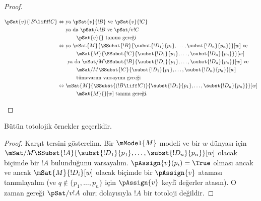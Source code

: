 \begin{proof}
\begin{enumerate}
{{\begin{align*}
        \pSat{v}{!B \liff !C} \Leftrightarrow {} &
        \text{ya } \pSat{v}{!B} \text{ ve } \pSat{v}{!C}\\
        & \text{ya da } \pSat/{v}{!B} \text{ ve } \pSat/{v}{!C}\\
        &\qquad \text{$\pSat{v}{}$ tanımı gereği}\\
        \Leftrightarrow {} &
        \text{ya } \mSat{M}{\SSubst{!B}{\subst{!D_1}{p_1}, \dots,
            \subst{!D_n}{p_n}}}[w] \text{ ve }\\
        & \qquad \mSat{M}{\SSubst{!C}{\subst{!D_1}{p_1}, \dots,
          \subst{!D_n}{p_n}}}[w]\\ 
        &  \text{ ya da } \mSat/{M}{\SSubst{!B}{\subst{!D_1}{p_1}, \dots,
            \subst{!D_n}{p_n}}}[w] \text{ ve }\\
        & \qquad \mSat/{M}{\SSubst{!C}{\subst{!D_1}{p_1}, \dots,
          \subst{!D_n}{p_n}}}[w]\\
        &\qquad\text{tümevarım varsayımı gereği}\\
        \Leftrightarrow {} &
        \mSat{M}{\SSubst{(!B \liff !C)}{\subst{!D_1}{p_1}, \dots,
          \subst{!D_n}{p_n}}}[w]\\
        &\qquad \text{$\mSat{M}{}[w]$ tanımı gereği}.
      \end{align*}}}{}
  \end{enumerate}
  \end{proof}

\begin{prop}
  Bütün totolojik örnekler geçerlidir.
\end{prop}

\begin{proof}
  Karşıt tersini gösterelim. Bir $\mModel{M}$ modeli ve bir $w$ dünyası için
  $\mSat/{M}{\SSubst{!A}{\subst{!D_1}{p_1}, \dots,
  \subst{!D_n}{p_n}}}[w]$ olacak biçimde bir $!A$ bulunduğunu varsayalım.
  $\pAssign{v}(p_i) = \True$ olması ancak ve ancak $\mSat{M}{!D_i}[w]$
  olacak biçimde bir $\pAssign{v}$ ataması tanımlayalım (ve $q \notin
  \{p_1, \dots, p_n \}$ için $\pAssign{v}$ keyfî değerler atasın). O zaman
   gereği $\pSat/{v}{!A}$ olur; dolayısıyla $!A$ bir
  totoloji değildir.
\end{proof}

